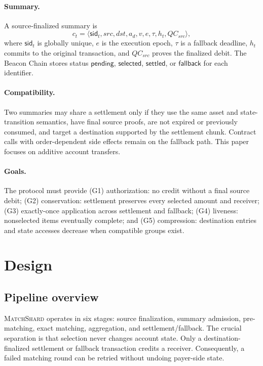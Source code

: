 \documentclass[sigconf,anonymous,review]{acmart}
\newcommand{\system}{\textsc{MatchShard}\xspace}
\newcommand{\sid}{\mathsf{sid}}
\begin{document}
\paragraph{Summary.}
A source-finalized summary is
\[
 c_t=\langle \sid_t,src,dst,a_d,v,e,\tau,h_t,QC_{src}\rangle,
\]
where $\sid_t$ is globally unique, $e$ is the execution epoch, $\tau$ is a fallback deadline, $h_t$ commits to the original transaction, and $QC_{src}$ proves the finalized debit. The Beacon Chain stores status $\mathsf{pending}$, $\mathsf{selected}$, $\mathsf{settled}$, or $\mathsf{fallback}$ for each identifier.

\paragraph{Compatibility.}
Two summaries may share a settlement only if they use the same asset and state-transition semantics, have final source proofs, are not expired or previously consumed, and target a destination supported by the settlement chunk. Contract calls with order-dependent side effects remain on the fallback path. This paper focuses on additive account transfers.

\paragraph{Goals.}
The protocol must provide (G1) authorization: no credit without a final source debit; (G2) conservation: settlement preserves every selected amount and receiver; (G3) exactly-once application across settlement and fallback; (G4) liveness: nonselected items eventually complete; and (G5) compression: destination entries and state accesses decrease when compatible groups exist.

\section{Design}

\subsection{Pipeline overview}

\system operates in six stages: source finalization, summary admission, pre-matching, exact matching, aggregation, and settlement/fallback. The crucial separation is that selection never changes account state. Only a destination-finalized settlement or fallback transaction credits a receiver. Consequently, a failed matching round can be retried without undoing payer-side state.
\end{document}
